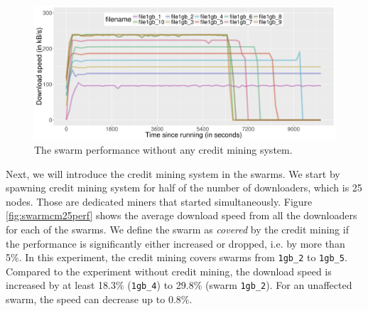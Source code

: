 \begin{figure}[h]
	\centering
	\includegraphics[width=\textwidth]{pics/results/swperf_n2.png}
	\caption{The swarm performance without any credit mining system.}
	\label{fig:swarmnocmperf}
\end{figure}


Next, we will introduce the credit mining system in the swarms. We start by spawning credit mining system for half of the number of downloaders, which is 25 nodes. Those are dedicated miners that started simultaneously. Figure \ref{fig:swarmcm25perf} shows the average download speed from all the downloaders for each of the swarms. We define the swarm as \textit{covered} by the credit mining if the performance is significantly either increased or dropped, i.e. by more than 5\%. In this experiment, the credit mining covers swarms from \texttt{1gb\_2} to \texttt{1gb\_5}. Compared to the experiment without credit mining, the download speed is increased by at least 18.3\% (\texttt{1gb\_4}) to 29.8\% (swarm \texttt{1gb\_2}). For an unaffected swarm, the speed can decrease up to 0.8\%.

